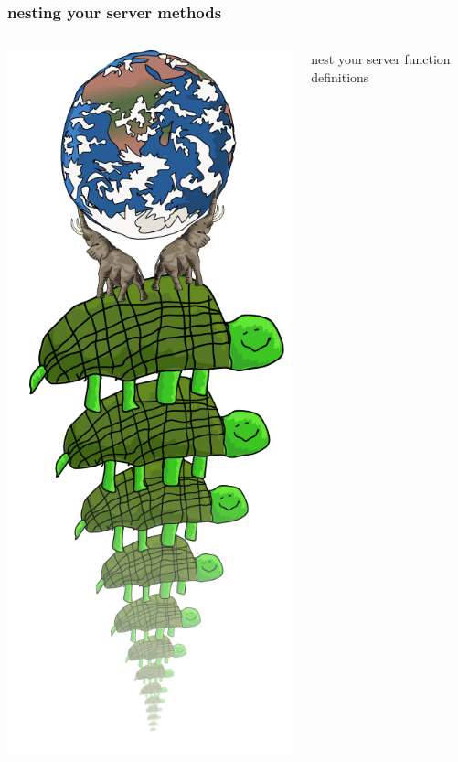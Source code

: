\documentclass{beamer}
\begin{document}
\begin{frame}
    \frametitle{nesting your server methods}
    \begin{columns}[c]
        \includegraphics[scale=0.28]{images/all_the_way_down.png}
        \begin{center}
        \fbox{}
        \newline
        
        \pause
        \huge
        nest your server function definitions
        
        \end{center}
    \end{columns}
\end{frame}
\end{document}
